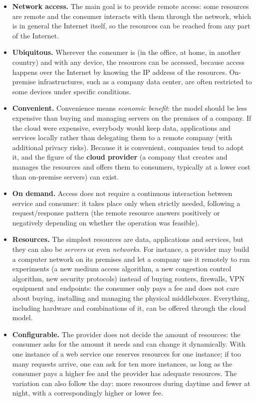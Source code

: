 \begin{itemize}
	\item \textbf{Network access.} The main goal is to provide remote access: some resources are remote and the consumer interacts with them through the network, which is in general the Internet itself, so the resources can be reached from any part of the Internet.
	\item \textbf{Ubiquitous.} Wherever the consumer is (in the office, at home, in another country) and with any device, the resources can be accessed, because access happens over the Internet by knowing the IP address of the resources. On-premise infrastructures, such as a company data center, are often restricted to some devices under specific conditions.
	\item \textbf{Convenient.} Convenience means \emph{economic benefit}: the model should be less expensive than buying and managing servers on the premises of a company. If the cloud were expensive, everybody would keep data, applications and services locally rather than delegating them to a remote company (with additional privacy risks). Because it is convenient, companies tend to adopt it, and the figure of the \textbf{cloud provider} (a company that creates and manages the resources and offers them to consumers, typically at a lower cost than on-premise servers) can exist.
	\item \textbf{On demand.} Access does not require a continuous interaction between service and consumer: it takes place only when strictly needed, following a request/response pattern (the remote resource answers positively or negatively depending on whether the operation was feasible).
	\item \textbf{Resources.} The simplest resources are data, applications and services, but they can also be \emph{servers} or even \emph{networks}. For instance, a provider may build a computer network on its premises and let a company use it remotely to run experiments (a new medium access algorithm, a new congestion control algorithm, new security protocols) instead of buying routers, firewalls, VPN equipment and endpoints: the consumer only pays a fee and does not care about buying, installing and managing the physical middleboxes. Everything, including hardware and combinations of it, can be offered through the cloud model.
	\item \textbf{Configurable.} The provider does not decide the amount of resources: the consumer asks for the amount it needs and can change it dynamically. With one instance of a web service one reserves resources for one instance; if too many requests arrive, one can ask for ten more instances, as long as the consumer pays a higher fee and the provider has adequate resources. The variation can also follow the day: more resources during daytime and fewer at night, with a correspondingly higher or lower fee.

\end{itemize}
